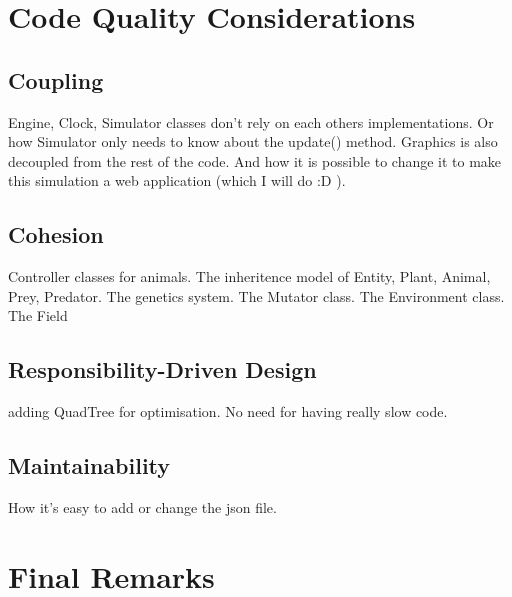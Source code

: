 \documentclass[10pt, a4paper]{scrartcl}
\begin{document}
\begin{multicols}{2}
    \section{Code Quality Considerations}

    \subsection{Coupling}
    Engine, Clock, Simulator classes don't rely on each others implementations. Or how Simulator only needs to know about 
    the update() method. Graphics is also decoupled from the rest of the code. And how it is possible to change it 
    to make this simulation a web application (which I will do :D ).

    \subsection{Cohesion}
    Controller classes for animals. The inheritence model of Entity, Plant, Animal, Prey, Predator. The genetics system.
    The Mutator class. The Environment class. The Field

    \subsection{Responsibility-Driven Design}
    adding QuadTree for optimisation. No need for having really slow code.

    \subsection{Maintainability}
    How it's easy to add or change the json file.

    \section{Final Remarks}

  \end{multicols}
\end{document}
